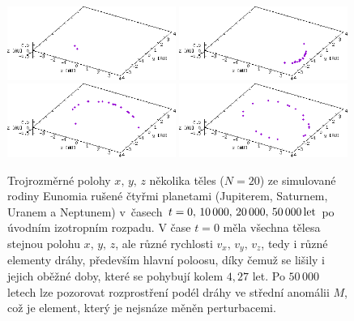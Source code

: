 \documentclass[A4paper, 12pt, oneside]{book}
\begin{document}
\immediate{}
\immediate{}
\immediate{}
\immediate{}
\begin{figure}
	\centering
	\includegraphics[width=0.49\textwidth]{obr/trajec_001t.png}
	\includegraphics[width=0.49\textwidth]{obr/trajec_101t.png} \\
	\includegraphics[width=0.49\textwidth]{obr/trajec_201t.png}
	\includegraphics[width=0.49\textwidth]{obr/trajec_501t.png}
	\caption{Trojrozměrné polohy $x,\,y,\,z$ několika těles ($N=20$) ze simulované rodiny Eunomia rušené čtyřmi planetami (Jupiterem, Saturnem, Uranem a Neptunem) v~časech $t=0,\,10\,000,\,20\,000,\,50\,000\,{\rm let}$ po úvodním izotropním rozpadu. V čase $t=0$ měla všechna tělesa stejnou polohu $x,\,y,\,z$, ale různé rychlosti $v_x,\,v_y,\,v_z$, tedy i různé elementy dráhy, především hlavní poloosu, díky čemuž se lišily i jejich oběžné doby, které se pohybují kolem $4,27$ let. Po $50\,000$ letech lze pozorovat rozprostření podél dráhy ve střední anomálii $M$, což je element, který je nejsnáze měněn perturbacemi.} \label{fig:trajec}
\end{figure}
\end{document}
